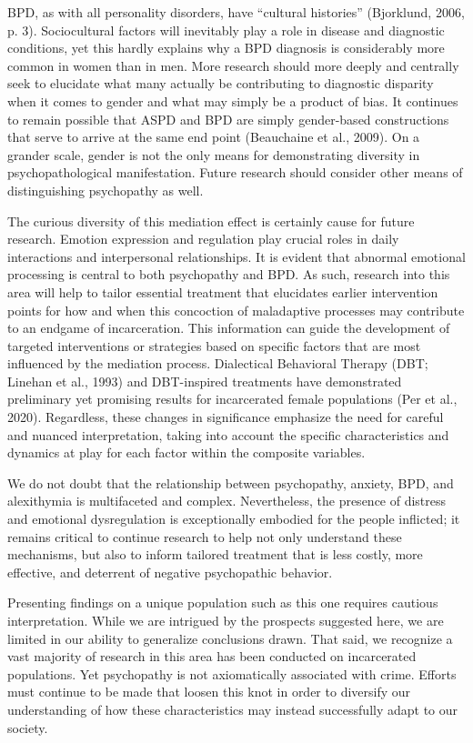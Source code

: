 \documentclass[
  man,floatsintext]{apa7}
\begin{document}
BPD, as with all personality disorders, have ``cultural histories'' (Bjorklund, 2006, p. 3). Sociocultural factors will inevitably play a role in disease and diagnostic conditions, yet this hardly explains why a BPD diagnosis is considerably more common in women than in men. More research should more deeply and centrally seek to elucidate what many actually be contributing to diagnostic disparity when it comes to gender and what may simply be a product of bias. It continues to remain possible that ASPD and BPD are simply gender-based constructions that serve to arrive at the same end point (Beauchaine et al., 2009). On a grander scale, gender is not the only means for demonstrating diversity in psychopathological manifestation. Future research should consider other means of distinguishing psychopathy as well.

The curious diversity of this mediation effect is certainly cause for future research. Emotion expression and regulation play crucial roles in daily interactions and interpersonal relationships. It is evident that abnormal emotional processing is central to both psychopathy and BPD. As such, research into this area will help to tailor essential treatment that elucidates earlier intervention points for how and when this concoction of maladaptive processes may contribute to an endgame of incarceration. This information can guide the development of targeted interventions or strategies based on specific factors that are most influenced by the mediation process. Dialectical Behavioral Therapy (DBT; Linehan et al., 1993) and DBT-inspired treatments have demonstrated preliminary yet promising results for incarcerated female populations (Per et al., 2020). Regardless, these changes in significance emphasize the need for careful and nuanced interpretation, taking into account the specific characteristics and dynamics at play for each factor within the composite variables.

We do not doubt that the relationship between psychopathy, anxiety, BPD, and alexithymia is multifaceted and complex. Nevertheless, the presence of distress and emotional dysregulation is exceptionally embodied for the people inflicted; it remains critical to continue research to help not only understand these mechanisms, but also to inform tailored treatment that is less costly, more effective, and deterrent of negative psychopathic behavior.

Presenting findings on a unique population such as this one requires cautious interpretation. While we are intrigued by the prospects suggested here, we are limited in our ability to generalize conclusions drawn. That said, we recognize a vast majority of research in this area has been conducted on incarcerated populations. Yet psychopathy is not axiomatically associated with crime. Efforts must continue to be made that loosen this knot in order to diversify our understanding of how these characteristics may instead successfully adapt to our society.
\end{document}
